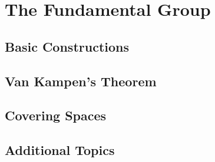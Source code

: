 \chapter{The Fundamental Group}
\section{Basic Constructions}
\section{Van Kampen's Theorem}
\section{Covering Spaces}
\section{Additional Topics}

